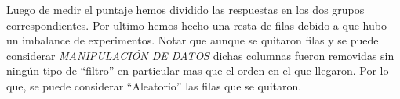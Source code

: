 \documentclass[
]{article}
\newenvironment{Shaded}{\begin{snugshade}}{\end{snugshade}}
\newcommand{\AttributeTok}[1]{\textcolor[rgb]{0.77,0.63,0.00}{#1}}
\newcommand{\ControlFlowTok}[1]{\textcolor[rgb]{0.13,0.29,0.53}{\textbf{#1}}}
\newcommand{\DecValTok}[1]{\textcolor[rgb]{0.00,0.00,0.81}{#1}}
\newcommand{\FunctionTok}[1]{\textcolor[rgb]{0.00,0.00,0.00}{#1}}
\newcommand{\NormalTok}[1]{#1}
\newcommand{\OtherTok}[1]{\textcolor[rgb]{0.56,0.35,0.01}{#1}}
\newcommand{\SpecialCharTok}[1]{\textcolor[rgb]{0.00,0.00,0.00}{#1}}
\newcommand{\StringTok}[1]{\textcolor[rgb]{0.31,0.60,0.02}{#1}}
\begin{document}
\begin{Shaded}
\end{Shaded}

Luego de medir el puntaje hemos dividido las respuestas en los dos
grupos correspondientes. Por ultimo hemos hecho una resta de filas
debido a que hubo un imbalance de experimentos. Notar que aunque se
quitaron filas y se puede considerar \emph{MANIPULACIÓN DE DATOS} dichas
columnas fueron removidas sin ningún tipo de ``filtro'' en particular
mas que el orden en el que llegaron. Por lo que, se puede considerar
``Aleatorio'' las filas que se quitaron.
\end{document}
